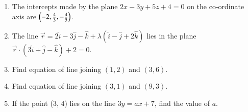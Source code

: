 \begin{enumerate}[label=\thesubsection.\arabic*,ref=\thesubsection.\theenumi]
\begin{enumerate}
\end{enumerate}
\item The intercepts made by the plane $2x-3y+5z+4=0$ on the co-ordinate axis are $\left(-2,\frac{4}{3},-\frac{4}{5}\right)$.
\item The line $\overrightarrow{r}=2\hat{i}-3\hat{j}-\hat{k}+\lambda(\hat{i}-\hat{j}+2\hat{k})$ lies in the plane $\overrightarrow{r} \cdot (3\hat{i}+\hat{j}-\hat{k})+2=0$.
\item Find equation of line joining $(1,2)$ and $(3,6)$.
\item Find equation of line joining $(3,1)$ and $(9,3)$.
\item If the point (3, 4) lies on the line $3y=ax+7$, find the value of $a$.
\end{enumerate}
